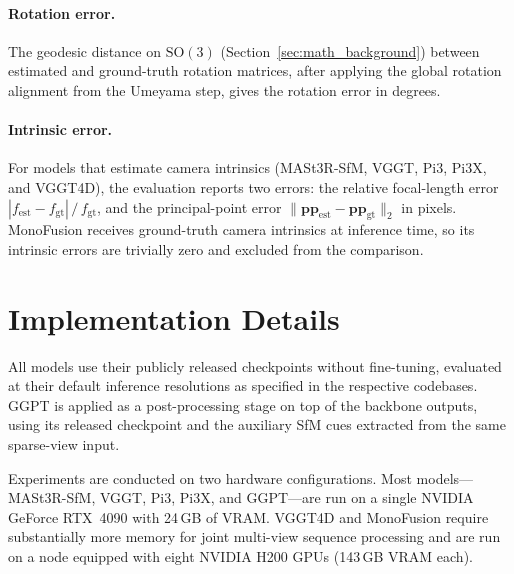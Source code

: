 \paragraph{Rotation error.}
The geodesic distance on $\mathrm{SO}(3)$ (Section~\ref{sec:math_background}) between estimated and ground-truth rotation matrices, after applying the global rotation alignment from the Umeyama step, gives the rotation error in degrees.

\paragraph{Intrinsic error.}
For models that estimate camera intrinsics (MASt3R-SfM, VGGT, Pi3, Pi3X, and VGGT4D), the evaluation reports two errors: the relative focal-length error $|f_{\text{est}} - f_{\text{gt}}|\,/\,f_{\text{gt}}$, and the principal-point error $\|\mathbf{pp}_{\text{est}} - \mathbf{pp}_{\text{gt}}\|_2$ in pixels. MonoFusion receives ground-truth camera intrinsics at inference time, so its intrinsic errors are trivially zero and excluded from the comparison.

\section{Implementation Details}
\label{sec:implementation_details}

All models use their publicly released checkpoints without fine-tuning,
evaluated at their default inference resolutions as specified in the respective codebases. GGPT is applied as a
post-processing stage on top of the backbone outputs, using its released checkpoint and
the auxiliary SfM cues extracted from the same sparse-view input.

Experiments are conducted on two hardware configurations. Most models---MASt3R-SfM,
VGGT, Pi3, Pi3X, and GGPT---are run on a single NVIDIA GeForce RTX~4090 with 24\,GB of
VRAM. VGGT4D and MonoFusion require substantially more memory for joint multi-view
sequence processing and are run on a node equipped with eight NVIDIA H200 GPUs
(143\,GB VRAM each).